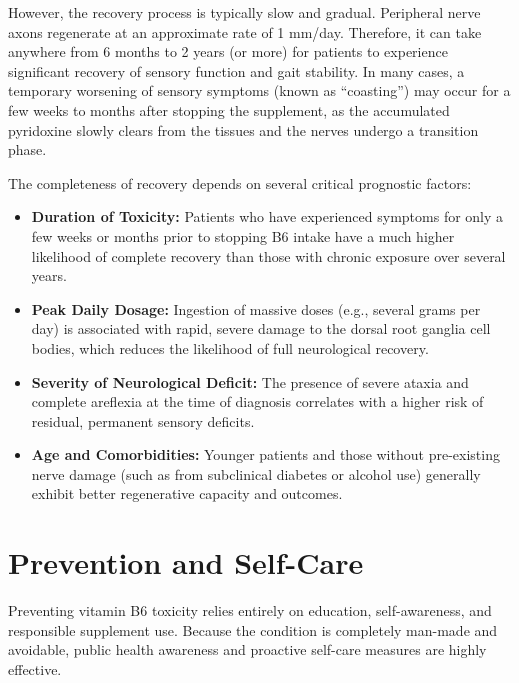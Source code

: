 However, the recovery process is typically slow and gradual. Peripheral nerve axons regenerate at an approximate rate of 1 mm/day. Therefore, it can take anywhere from 6 months to 2 years (or more) for patients to experience significant recovery of sensory function and gait stability. In many cases, a temporary worsening of sensory symptoms (known as ``coasting'') may occur for a few weeks to months after stopping the supplement, as the accumulated pyridoxine slowly clears from the tissues and the nerves undergo a transition phase.

The completeness of recovery depends on several critical prognostic factors:
\begin{itemize}
    \item \textbf{Duration of Toxicity:} Patients who have experienced symptoms for only a few weeks or months prior to stopping B6 intake have a much higher likelihood of complete recovery than those with chronic exposure over several years.
    \item \textbf{Peak Daily Dosage:} Ingestion of massive doses (e.g., several grams per day) is associated with rapid, severe damage to the dorsal root ganglia cell bodies, which reduces the likelihood of full neurological recovery.
    \item \textbf{Severity of Neurological Deficit:} The presence of severe ataxia and complete areflexia at the time of diagnosis correlates with a higher risk of residual, permanent sensory deficits.
    \item \textbf{Age and Comorbidities:} Younger patients and those without pre-existing nerve damage (such as from subclinical diabetes or alcohol use) generally exhibit better regenerative capacity and outcomes.
\end{itemize}

\section*{Prevention and Self-Care}
Preventing vitamin B6 toxicity relies entirely on education, self-awareness, and responsible supplement use. Because the condition is completely man-made and avoidable, public health awareness and proactive self-care measures are highly effective.

